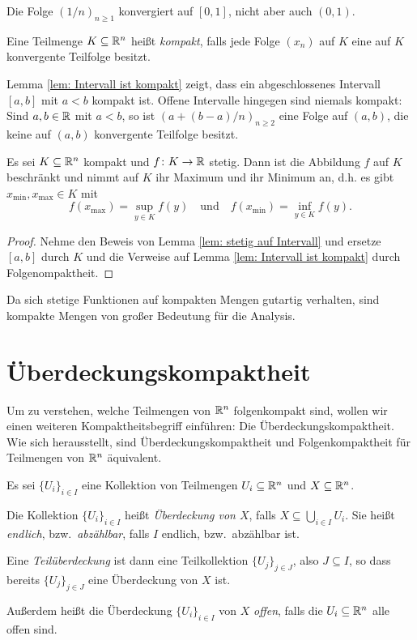 \documentclass[a4paper,10pt]{article}
\begin{document}
\begin{bsp}
 Die Folge $(1/n)_{n \geq 1}$ konvergiert auf $[0,1]$, nicht aber auch $(0,1)$.
\end{bsp}


\begin{defi}
 Eine Teilmenge $K \subseteq \mathbb{R}^n$ heißt \emph{kompakt}, falls jede Folge $(x_n)$ auf $K$ eine auf $K$ konvergente Teilfolge besitzt.
\end{defi}


\begin{bsp}
 Lemma \ref{lem: Intervall ist kompakt} zeigt, dass ein abgeschlossenes Intervall $[a,b]$ mit $a < b$ kompakt ist. Offene Intervalle hingegen sind niemals kompakt: Sind $a,b \in \mathbb{R}$ mit $a < b$, so ist $(a + (b-a)/n)_{n \geq 2}$ eine Folge auf $(a,b)$, die keine auf $(a,b)$ konvergente Teilfolge besitzt.
\end{bsp}


\begin{prop}
 Es sei $K \subseteq \mathbb{R}^n$ kompakt und $f \colon K \to \mathbb{R}$ stetig. Dann ist die Abbildung $f$ auf $K$ beschränkt und nimmt auf $K$ ihr Maximum und ihr Minimum an, d.h. es gibt $x_{\text{min}}, x_{\text{max}} \in K$ mit
 \[
  f(x_{\text{max}}) = \sup_{y \in K} f(y)
  \quad
  \text{und}
  \quad
  f(x_{\text{min}}) = \inf_{y \in K} f(y).
 \]
\end{prop}
\begin{proof}
 Nehme den Beweis von Lemma \ref{lem: stetig auf Intervall} und ersetze $[a,b]$ durch $K$ und die Verweise auf Lemma \ref{lem: Intervall ist kompakt} durch Folgenompaktheit.
\end{proof}


Da sich stetige Funktionen auf kompakten Mengen gutartig verhalten, sind kompakte Mengen von großer Bedeutung für die Analysis.





\section{Überdeckungskompaktheit}


Um zu verstehen, welche Teilmengen von $\mathbb{R}^n$ folgenkompakt sind, wollen wir einen weiteren Kompaktheitsbegriff einführen: Die Überdeckungskompaktheit. Wie sich herausstellt, sind Überdeckungskompaktheit und Folgenkompaktheit für Teilmengen von $\mathbb{R}^n$ äquivalent.


\begin{defi}
 Es sei $\{U_i\}_{i \in I}$ eine Kollektion von Teilmengen $U_i \subseteq \mathbb{R}^n$ und $X \subseteq \mathbb{R}^n$.
 
 Die Kollektion $\{U_i\}_{i \in I}$ heißt \emph{Überdeckung von $X$}, falls $X \subseteq \bigcup_{i \in I} U_i$. Sie heißt \emph{endlich}, bzw.\ \emph{abzählbar}, falls $I$ endlich, bzw.\ abzählbar ist.
 
 Eine \emph{Teilüberdeckung} ist dann eine Teilkollektion $\{U_j\}_{j \in J}$, also $J \subseteq I$, so dass bereits $\{U_j\}_{j \in J}$ eine Überdeckung von $X$ ist.
 
 Außerdem heißt die Überdeckung $\{U_i\}_{i \in I}$ von $X$ \emph{offen}, falls die $U_i \subseteq \mathbb{R}^n$ alle offen sind.
\end{defi}
\end{document}
